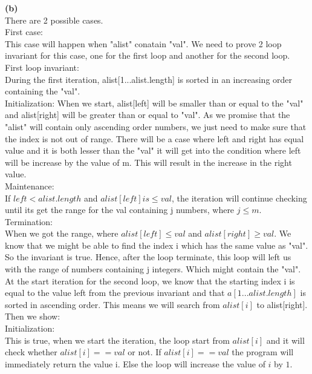 \documentclass[a4paper, 11pt]{article}
\renewcommand{\part}[1] {\vspace{.10in} {\bf (#1)}}
\begin{document}
\part{b}\\
There are 2 possible cases.\\
First case:\\
This case will happen when "alist" conatain "val". We need to prove 2 loop invariant for this case, one for the first loop and another for the second loop.
First loop invariant:\\
During the first iteration, alist[1...alist.length] is sorted in an increasing order containing the "val".\\
Initialization: When we start, alist[left] will be smaller than or equal to the "val" and alist[right] will be greater than or equal to "val". As we promise that the "alist" will contain only ascending order numbers, we just need to make sure that the index is not out of range. There will be a case where left and right has equal value and it is both lesser than the "val" it will get into the condition where left will be increase by the value of m. This will result in the increase in the right value.\\
Maintenance:\\
If $left < alist.length$ and $alist[left] is \leq val$, the iteration will continue checking until its get the range for the val containing j numbers, where $j \leq m$.\\
Termination:\\
When we got the range, where $alist[left] \leq val$ and $alist[right] \geq val$. We know that we might be able to find the index i which has the same value as "val".\\
So the invariant is true. Hence, after the loop terminate, this loop will left us with the range of numbers containing j integers. Which might contain the "val".\\
At the start iteration for the second loop, we know that the starting index i is equal to the value left from the previous invariant and that $a[1...alist.length]$ is sorted in ascending order. This means we will search from $alist[i]$ to alist[right].\\
Then we show:\\
Initialization:\\
This is true, when we start the iteration, the loop start from $alist[i]$ and it will check whether $alist[i] == val$ or not. If $alist[i] == val$ the program will immediately return the value i. Else the loop will increase the value of $i$ by $1$.\\
\end{document}
